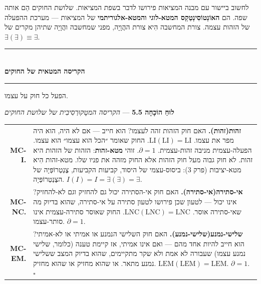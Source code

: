 \documentclass[10pt, openany, oneside]{book}
\renewcommand{\normalsize}{\fontsize{10}{13}\selectfont}
\renewcommand{\footnotesize}{\fontsize{8.5}{11}\selectfont}
\begin{document}
לחשוב ביישור עם מבנה המציאות פירושו לדבר בשפת המציאות. שלושת החוקים הֵם אותה שפה. הם \textbf{האוֹנְטוֹסִינְטַקְס המטא-לוגי והמטא-אלגוריתמי} של המציאות — מערכת ההפעלה של הזהות עצמה. צורת המחשבה הִיא צורת ההֲוָיָה, מפני שמחשבה והֲוָיָה שתיהן מקרים של $\exists(\exists) \equiv \exists$.

\vspace{1.5em}


\begin{center}
    \rule{0.3\textwidth}{0.4pt}\\[0.5em]
    {\normalsize\bfseries\textsc{הקריסה המטאית של החוקים}}\\[0.3em]
    \rule{0.3\textwidth}{0.4pt}
\end{center}

\vspace{1em}

\noindent הפעל כל חוק על עצמו.

\textbf{לוּחַ הוֹכָחָה 5.5} --- \textit{הקריסה המטָקוּרְסִיבִית של שלושת החוקים}

\vspace{0.5em}

{\footnotesize
\noindent\begin{tabular}{r p{}}
\textbf{MC-I.} & \textbf{זהות(זהות).} האם חוק הזהות זהה לעצמו? הוא חייב — אם לא היה, הוא היה מפר את עצמו. $\text{LI}(\text{LI}) = \text{LI}$. החוק שאומר ״הכל הוא עצמו״ הוא עצמו. הפעלה-עצמית מניבה זהות-עצמית. $\partial = 1$. זוהי \textbf{מטא-זהות}: הזהות של הזהות היא זהות. לא חוק גבוה מעל חוק הזהות אלא החוק מזהה את פניו שלו. מטא-זהות הִיא מטא-יציבות (פרק 3): ביסוס-עצמי של היסוד, קביעות הקביעות, צֶנְטְרוֹפְּיָה של הצֶנְטְרוֹפְּיָה. $I(I) = I = \exists(\exists) = \exists$. \\[0.3em]
\textbf{MC-NC.} & \textbf{אי-סתירה(אי-סתירה).} האם חוק אי-הסתירה יכול גם להחזיק וגם לא-להחזיק? אינו יכול — לטעון שכן פירושו לטעון סתירה על אי-סתירה, שהוא בדיוק מה שאי-סתירה אוסר. $\text{LNC}(\text{LNC}) = \text{LNC}$. החוק שאוסר סתירה-עצמית אינו סותר-עצמו. $\partial = 1$. \\[0.3em]
\textbf{MC-EM.} & \textbf{שלישי-נמנע(שלישי-נמנע).} האם חוק השלישי הנמנע או אמיתי או לא-אמיתי? הוא חייב להיות אחד מהם — ואם אינו אמיתי, אז קיימת טענה (כלומר, שלישי נמנע עצמו) שעבורה לא אמת ולא שקר מתקיימים, שהוא בדיוק המצב ששלישי נמנע מתאר. או שהוא מחזיק או שהוא מחזיק. $\text{LEM}(\text{LEM}) = \text{LEM}$. $\partial = 1$. $\square$ \\[0.3em]
\end{tabular}
}
\end{document}
